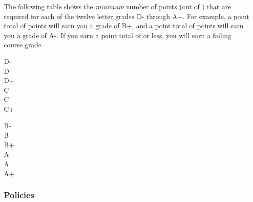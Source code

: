 \documentclass[12pt,fullpage]{article}
\newcounter{ex}\setcounter{ex}{0}
\newenvironment{mypar}[2]
  {\begin{list}{}%
    {\setlength\leftmargin{#1}
    \setlength\rightmargin{#2}}
    \item[]}
  {\end{list}}
\begin{document}
 
 
 The following table shows the \emph{minimum} number of points (out of \points) that
 are required for each of the twelve letter grades D- through A+. For
 example, a point total of \Bp\/  points will earn you a grade of B+,  and 
 a point total of \Am\/ points will earn you a grade of A-. If you earn a point
 total of \F\/  or less, you will earn a failing course grade.
  
  \vspace{0.1in}
      \begin{minipage}{5.5in}
   \centering 
 \begin{mypar}{0.25in}{0.25in}
     \begin{minipage}{2.5in}
         D-  \dotfill \Dm \\
         D \dotfill \D \\
         D+ \dotfill \Dp \\
         C- \dotfill \Cm  \\
         C \dotfill \C \\
         C+ \dotfill \Cp 
         \end{minipage}
     \phantom{xxx}
     \begin{minipage}{2.5in}
         B- \dotfill \Bm \\
         B \dotfill  \B \\
         B+ \dotfill  \Bp\\
         A- \dotfill  \Am \\
         A \dotfill  \A \\
         A+ \dotfill  \Ap
     \end{minipage}
 \end{mypar} 
 \end{minipage}




\subsubsection* {Policies}
\end{document}
